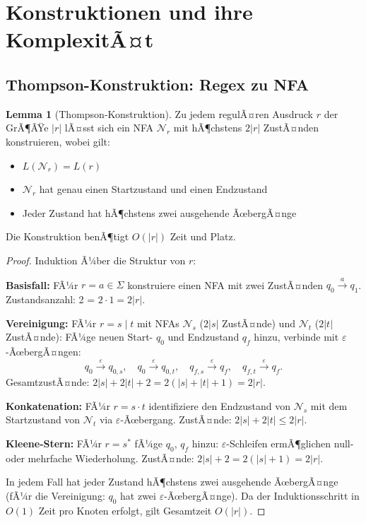 ﻿\documentclass[a4paper,12pt]{article}
\theoremstyle{definition}
\newtheorem{lemma}{Lemma}
\begin{document}
\section{Konstruktionen und ihre KomplexitÃ¤t}

\subsection{Thompson-Konstruktion: Regex zu NFA}

\begin{lemma}[Thompson-Konstruktion]
	\label{lem:thompson}
	Zu jedem regulÃ¤ren Ausdruck $r$ der GrÃ¶ÃŸe $|r|$ lÃ¤sst sich ein NFA
	$\mathcal{N}_r$ mit hÃ¶chstens $2|r|$ ZustÃ¤nden konstruieren, wobei gilt:
	\begin{itemize}
		\item $L(\mathcal{N}_r) = L(r)$
		\item $\mathcal{N}_r$ hat genau einen Startzustand und einen Endzustand
		\item Jeder Zustand hat hÃ¶chstens zwei ausgehende ÃœbergÃ¤nge
	\end{itemize}
	Die Konstruktion benÃ¶tigt $O(|r|)$ Zeit und Platz.
\end{lemma}

\begin{proof}
	Induktion Ã¼ber die Struktur von $r$:

	\textbf{Basisfall:} FÃ¼r $r = a \in \Sigma$ konstruiere einen NFA mit zwei
	ZustÃ¤nden $q_0 \xrightarrow{a} q_1$. Zustandsanzahl: 2 = $2 \cdot 1 = 2|r|$.

	\textbf{Vereinigung:} FÃ¼r $r = s \mid t$ mit NFAs $\mathcal{N}_s$ ($2|s|$
	ZustÃ¤nde) und $\mathcal{N}_t$ ($2|t|$ ZustÃ¤nde): FÃ¼ge neuen Start- $q_0$ und
	Endzustand $q_f$ hinzu, verbinde mit $\varepsilon$-ÃœbergÃ¤ngen:
	\[
		q_0 \xrightarrow{\varepsilon} q_{0,s},\quad
		q_0 \xrightarrow{\varepsilon} q_{0,t},\quad
		q_{f,s} \xrightarrow{\varepsilon} q_f,\quad
		q_{f,t} \xrightarrow{\varepsilon} q_f.
	\]
	GesamtzustÃ¤nde: $2|s| + 2|t| + 2 = 2(|s|+|t|+1) = 2|r|$.

	\textbf{Konkatenation:} FÃ¼r $r = s \cdot t$ identifiziere den Endzustand von
	$\mathcal{N}_s$ mit dem Startzustand von $\mathcal{N}_t$ via
	$\varepsilon$-Ãœbergang. ZustÃ¤nde: $2|s| + 2|t| \leq 2|r|$.

	\textbf{Kleene-Stern:} FÃ¼r $r = s^*$ fÃ¼ge $q_0$, $q_f$ hinzu:
	$\varepsilon$-Schleifen ermÃ¶glichen null- oder mehrfache Wiederholung.
	ZustÃ¤nde: $2|s| + 2 = 2(|s|+1) = 2|r|$.

	In jedem Fall hat jeder Zustand hÃ¶chstens zwei ausgehende ÃœbergÃ¤nge (fÃ¼r die
	Vereinigung: $q_0$ hat zwei $\varepsilon$-ÃœbergÃ¤nge). Da der Induktionsschritt
	in $O(1)$ Zeit pro Knoten erfolgt, gilt Gesamtzeit $O(|r|)$. \qedhere
\end{proof}
\end{document}
